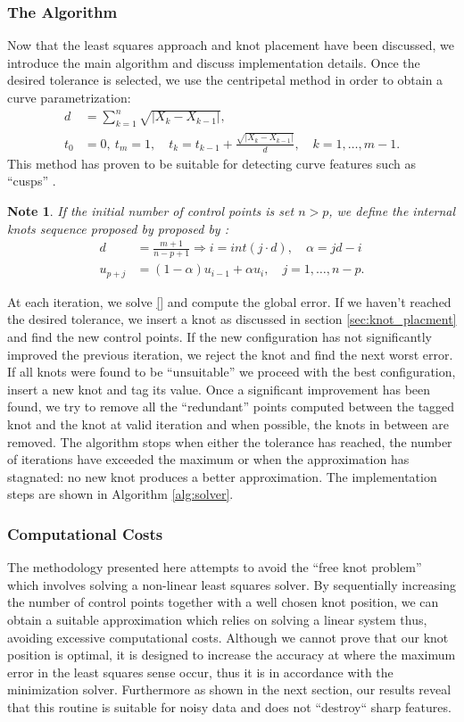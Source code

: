 \documentclass[a4paper,12pt]{article}
\newtheorem{note}{Note}[section]
\begin{document}
\subsubsection{The Algorithm}
Now that the least squares approach and knot placement have been discussed, we introduce the main algorithm and discuss implementation 
details. Once the desired tolerance is selected, we use the centripetal method in order to obtain a curve parametrization: 
\begin{align}
 d &= \sum_{k=1}^n \sqrt {| X_k-X_{k-1}|},\\
 t_0 &=0,\ t_m=1,\quad t_k = t_{k-1} + \frac{\sqrt{|X_k-X_{k-1}|}}{d},\quad k = 1,\ldots, m-1.
 \end{align}
This method has proven to be suitable for detecting curve features such as ``cusps'' \cite{}. 
\begin{note}
 If the initial number of control points is set $n > p$, we define the internal knots sequence proposed by proposed by \cite{}: 
  \begin{align}
  d &= \frac{m+1}{n-p+1} \Rightarrow i = int(j\cdot d),\quad \alpha = jd -i\\
  u_{p+j} &= (1-\alpha)u_{i-1} + \alpha u_i,\quad j = 1,\ldots,n-p.
 \end{align}
\end{note}

At each iteration, we solve \eqref{} and compute the global error. If we haven't reached the desired tolerance, 
we insert a knot as discussed in section \ref{sec:knot_placment} and find the new control points. If the 
new configuration has not significantly improved the previous iteration, we reject the knot and find the next worst error. 
 If all knots were found to be ``unsuitable'' we proceed with the best configuration, insert a new knot and tag its 
 value. Once a significant improvement has been found, we try to remove all the ``redundant'' points computed between the tagged knot and the 
 knot at valid iteration and when possible, the knots in between are removed. The algorithm stops when either the tolerance has reached, 
 the number of iterations have exceeded the maximum or when the approximation has stagnated: no new knot 
 produces a better approximation. The implementation steps are shown in Algorithm \ref{alg:solver}. 


\subsubsection{Computational Costs}
The methodology presented here attempts to avoid the ``free knot problem'' which involves solving a non-linear 
least squares solver. By sequentially increasing the number of control points together with a well chosen knot 
position, we can obtain a suitable approximation which relies on solving a linear system thus, avoiding excessive 
computational costs. Although we cannot prove that our knot position is optimal, it is designed to increase the accuracy 
 at where the maximum error in the least squares sense occur,
  thus it is in accordance with the minimization solver. 
  Furthermore as shown in the next section, our results reveal that this routine is suitable for 
   noisy data and does not ``destroy`` sharp features. 
   
\end{document}

